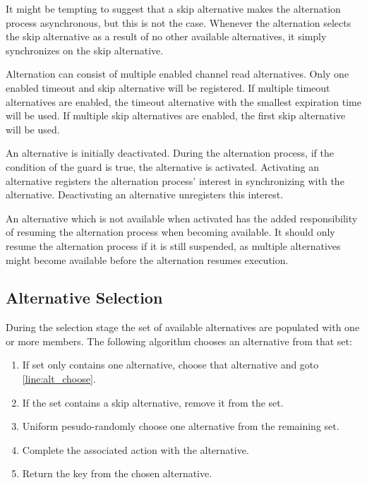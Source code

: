 It might be tempting to suggest that a skip alternative makes the alternation process asynch\-ronous, but this is not the case. Whenever the alternation selects the skip alternative as a result of no other available alternatives, it simply synchronizes on the skip alternative. 

Alternation can consist of multiple enabled channel read alternatives. Only one enabled timeout and skip alternative will be registered. If multiple timeout alternatives are enabled, the timeout alternative with the smallest expiration time will be used. If multiple skip alternatives are enabled, the first skip alternative will be used. 

An alternative is initially deactivated. During the alternation process, if the condition of the guard is true, the alternative is activated. Activating an alternative registers the alternation process' interest in synchronizing with the alternative. Deactivating an alternative unregisters this interest. 

An alternative which is not available when activated has the added responsibility of resuming the alternation process when becoming available. It should only resume the alternation process if it is still suspended, as multiple alternatives might become available before the alternation resumes execution.


\subsection{Alternative Selection}
\label{subsec:alternative_selection}

During the selection stage the set of available alternatives are populated with one or more members. The following algorithm chooses an alternative from that set:

\begin{enumerate}[topsep=0em,itemsep=-1em,partopsep=0.5em,parsep=1em]
    \item If set only contains one alternative, choose that alternative and goto \ref{line:alt_choose}.
    \item If the set contains a skip alternative, remove it from the set.
    \item Uniform pesudo\hyp{}randomly choose one alternative from the remaining set. 
    \item Complete the associated action with the alternative. \label{line:alt_choose}
    \item Return the key from the chosen alternative.
\end{enumerate}

